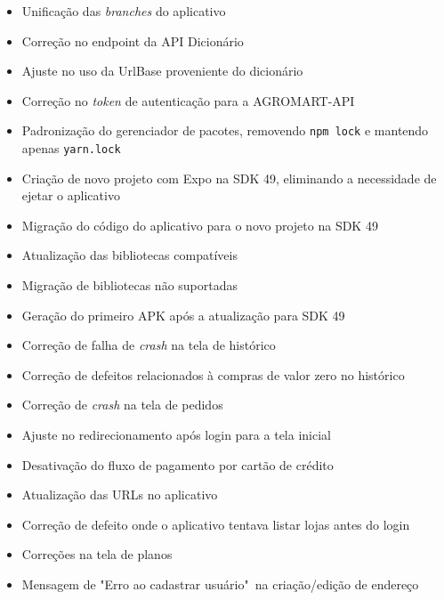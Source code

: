 \begin{itemize}
    \item Unificação das \textit{branches} do aplicativo
    \item Correção no endpoint da API Dicionário
    \item Ajuste no uso da UrlBase proveniente do dicionário
    \item Correção no \textit{token} de autenticação para a AGROMART-API
    \item Padronização do gerenciador de pacotes, removendo \texttt{npm lock} e mantendo apenas \texttt{yarn.lock}
    \item Criação de novo projeto com Expo na SDK 49, eliminando a necessidade de ejetar o aplicativo
    \item Migração do código do aplicativo para o novo projeto na SDK 49
    \item Atualização das bibliotecas compatíveis
    \item Migração de bibliotecas não suportadas
    \item Geração do primeiro APK após a atualização para SDK 49
    \item Correção de falha de \textit{crash} na tela de histórico
    \item Correção de defeitos relacionados à compras de valor zero no histórico
    \item Correção de \textit{crash} na tela de pedidos
    \item Ajuste no redirecionamento após login para a tela inicial
    \item Desativação do fluxo de pagamento por cartão de crédito
    \item Atualização das URLs no aplicativo
    \item Correção de defeito onde o aplicativo tentava listar lojas antes do login
    \item Correções na tela de planos
    \item Mensagem de "Erro ao cadastrar usuário"\ na criação/edição de endereço
\end{itemize}
